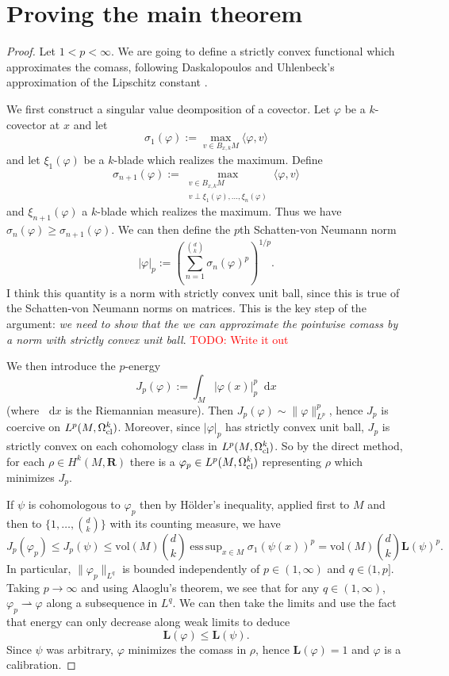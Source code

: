 \documentclass[reqno,11pt]{amsart}
\newcommand{\RR}{\mathbf{R}}
\newcommand*\dif{\mathop{}\!\mathrm{d}}
\newcommand{\vol}{\mathrm{vol}}
\newcommand{\Comass}{\mathbf L}
\newcommand{\weakto}{\rightharpoonup}
\theoremstyle{definition}
\DeclareMathOperator*{\esssup}{ess\,sup}
\numberwithin{equation}{section}
\newcommand\todo[1]{\textcolor{red}{TODO: #1}}
\begin{document}
\section{Proving the main theorem}
\begin{proof}
Let $1 < p < \infty$.
We are going to define a strictly convex functional which approximates the comass, following Daskalopoulos and Uhlenbeck's approximation of the Lipschitz constant \cite{daskalopoulos2022}.

We first construct a singular value deomposition of a covector.
Let $\varphi$ be a $k$-covector at $x$ and let 
$$\sigma_1(\varphi) := \max_{v \in B_{x, k} M} \langle \varphi, v\rangle$$
and let $\xi_1(\varphi)$ be a $k$-blade which realizes the maximum.
Define 
$$\sigma_{n + 1}(\varphi) := \max_{\substack{v \in B_{x, k} M \\ v \perp \xi_1(\varphi), \dots, \xi_n(\varphi)}} \langle \varphi, v\rangle$$
and $\xi_{n + 1}(\varphi)$ a $k$-blade which realizes the maximum.
Thus we have $\sigma_n(\varphi) \geq \sigma_{n + 1}(\varphi)$.
We can then define the $p$th Schatten-von Neumann norm 
$$|\varphi|_p := \left(\sum_{n=1}^{\binom dk} \sigma_n(\varphi)^p\right)^{1/p}.$$
I think this quantity is a norm with strictly convex unit ball, since this is true of the Schatten-von Neumann norms on matrices.
This is the key step of the argument: \emph{we need to show that the we can approximate the pointwise comass by a norm with strictly convex unit ball}. \todo{Write it out}

We then introduce the $p$-energy
$$J_p(\varphi) := \int_M |\varphi(x)|_p^p \dif x$$
(where $\dif x$ is the Riemannian measure).
Then $J_p(\varphi) \sim \|\varphi\|_{L^p}^p$, hence $J_p$ is coercive on $L^p(M, \Omega^k_{\rm cl})$.
Moreover, since $|\varphi|_p$ has strictly convex unit ball, $J_p$ is strictly convex on each cohomology class in $L^p(M, \Omega^k_{\rm cl})$.
So by the direct method, for each $\rho \in H^k(M, \RR)$ there is a $\varphi_p \in L^p(M, \Omega^k_{\rm cl})$ representing $\rho$ which minimizes $J_p$.

If $\psi$ is cohomologous to $\varphi_p$ then by H\"older's inequality, applied first to $M$ and then to $\{1, \dots, \binom dk\}$ with its counting measure, we have
$$J_p(\varphi_p) \leq J_p(\psi) \leq \vol(M) \binom dk \esssup_{x \in M} \sigma_1(\psi(x))^p = \vol(M) \binom dk \Comass(\psi)^p.$$
In particular, $\|\varphi_p\|_{L^q}$ is bounded independently of $p \in (1, \infty)$ and $q \in (1, p]$.
Taking $p \to \infty$ and using Alaoglu's theorem, we see that for any $q \in (1, \infty)$, $\varphi_p \weakto \varphi$ along a subsequence in $L^q$.
We can then take the limits and use the fact that energy can only decrease along weak limits to deduce 
$$\Comass(\varphi) \leq \Comass(\psi).$$
Since $\psi$ was arbitrary, $\varphi$ minimizes the comass in $\rho$, hence $\Comass(\varphi) = 1$ and $\varphi$ is a calibration.
\end{proof}
\end{document}
